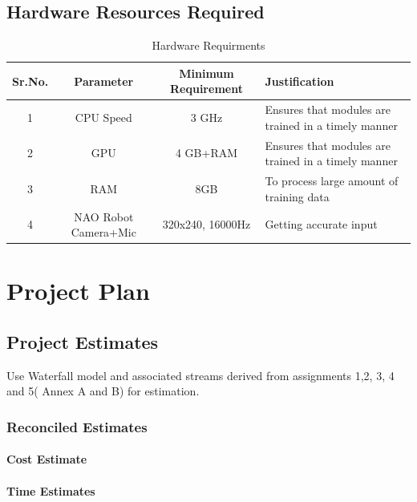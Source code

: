 \documentclass[oneside,a4paper,12pt]{report}
\begin{document}
\begin{normalsize}
\section{Hardware Resources Required}

\begin{table}[!htbp]
	\begin{center}
		\def\arraystretch{3}
		\begin{tabular}{| c | c | c | m{3cm} |}
			\hline
			Sr.No. & Parameter & Minimum Requirement	& Justification \\ \hline
			1 &	CPU Speed &	 3 GHz  & Ensures that modules are trained in a timely manner\\ \hline
			2 &	GPU  &	4 GB+RAM &  Ensures that modules are trained in a timely manner\\ \hline
			3 & RAM & 8GB & To process large amount of training data\\ \hline
			4 & NAO Robot Camera+Mic & 320x240, 16000Hz & Getting accurate input \\ \hline
		\end{tabular}
	\end{center}
	\caption{Hardware Requirments}
	\label{tab:hw_req}
\end{table}


\chapter{Project Plan}

\section{Project Estimates}
                 Use Waterfall model and associated streams derived from assignments 1,2, 3, 4 and 5( Annex A and B) for estimation. 
\subsection{Reconciled Estimates}
\subsubsection{Cost Estimate}

\subsubsection{Time Estimates}



\end{normalsize}
\end{document}
